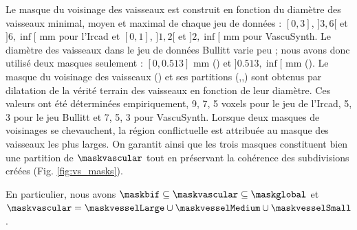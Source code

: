 Le masque du voisinage des vaisseaux est construit en fonction du diamètre des vaisseaux minimal, moyen et maximal de chaque jeu de données : $[0,3]$, $]3,6[$ et $]6,\inf[$ mm pour l'Ircad et $[0,1]$, $]1,2[$ et $]2,\inf[$ mm pour VascuSynth. Le diamètre des vaisseaux dans le jeu de données Bullitt varie peu ; nous avons donc utilisé deux masques seulement : $[0,0.513]$ mm (\maskvesselSmall) et $]0.513,\inf[$ mm (\maskvesselMedium). Le masque du voisinage des vaisseaux (\maskvessel) et ses partitions (\maskvesselLarge,\maskvesselMedium,\maskvesselSmall) sont obtenus par dilatation de la vérité terrain des vaisseaux en fonction de leur diamètre. Ces valeurs ont été déterminées empiriquement, 9, 7, 5 voxels pour le jeu de l'Ircad, 5, 3 pour le jeu Bullitt et 7, 5, 3 pour VascuSynth. Lorsque deux masques de voisinages se chevauchent, la région conflictuelle est attribuée au masque des vaisseaux les plus larges. On garantit ainsi que les trois masques constituent bien une partition de $\maskvascular$ tout en préservant la cohérence des subdivisions créées (Fig. \ref{fig:vs_masks}).


En particulier, nous avons $\maskbif \subseteq \maskvascular \subseteq \maskglobal$ et $\maskvascular = \maskvesselLarge \cup \maskvesselMedium \cup \maskvesselSmall$.

